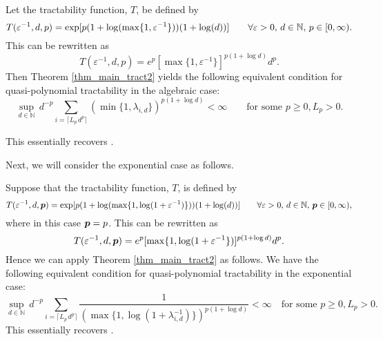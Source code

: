 \documentclass[sort&compress]{elsarticle}
\newcommand{\peter}[1]{\begingroup\color{violet}#1\endgroup}
\begin{document}
\begin{example}


Let the tractability function, $T$,
be defined by
\[
 T(\varepsilon^{-1},d,p)= \exp[ p(1+\log(\max\{1,\varepsilon^{-1}\}))(1+\log (d))]  \qquad \forall \varepsilon > 0, \,  d \in \mathbb{N}, \, p \in [0,\infty).
\]
This can be rewritten as
\[
T(\varepsilon^{-1},d,p) = e^p[\max\{1,\varepsilon^{-1}\}]^{p(1+\log d)}d^p.
\]
Then Theorem \ref{thm_main_tract2} yields the following equivalent condition for quasi-polynomial tractability in the algebraic case:
\[
\sup_{d\in\mathbb{N}}\,d^{-p}\sum_{i=\lceil L_p\,d^{p}\rceil} \left(\min\{1,\lambda_{i,d}\} \right)^{p(1+\log d)} < \infty \qquad \text{for some } p \geq 0, L_p >0.\]
\end{example}
This essentially recovers \cite[Theorem 23.1]{NovWoz12a}.

Next, we will consider the exponential case as follows.
\begin{example}

\noindent Suppose that the tractability function, $T$, is defined by
\[
 T(\varepsilon^{-1},d,\boldsymbol{p})= \exp [p(1+\log(\max\{1,\log(1+\varepsilon^{-1})\}))(1+\log (d))]  \qquad \forall \varepsilon > 0, \,  d \in \mathbb{N}, \, \boldsymbol{p} \in [0,\infty),
\] where in this case $\boldsymbol{p} = p$. This can be rewritten as
\[
T(\varepsilon^{-1},d,\boldsymbol{p}) = e^p[\max\{1,\log(1+\varepsilon^{-1}\})]^{p(1+\log d)}d^p.
\]
Hence we can apply Theorem \ref{thm_main_tract2} as follows. We have the following equivalent condition for quasi-polynomial tractability in the exponential case:
\[
\sup_{d\in\mathbb{N}}\,d^{-p}\sum_{i=\lceil L_p\,d^{p}\rceil} \frac{1}{\left(\max\{1,\log(1+\lambda_{i,d}^{-1})\} \right)^{p(1+\log d)}}< \infty \quad \text{for some } p \geq 0, L_p >0.
\]
This essentially recovers \cite[Theorem 2]{KriWoz19a}.
\end{example}
\end{document}
